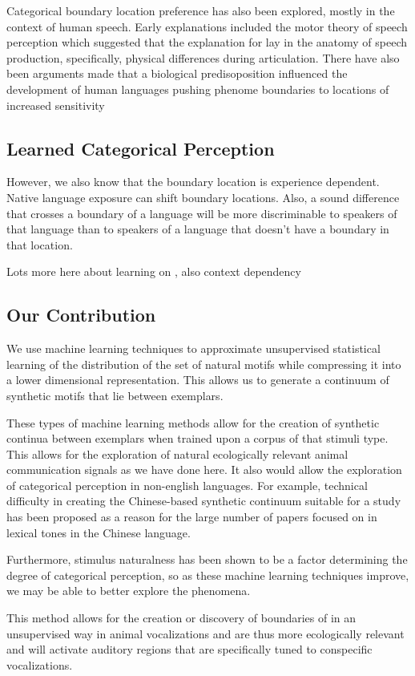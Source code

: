 Categorical boundary location preference has also been explored, mostly in the context of human speech. Early explanations included the motor theory of speech perception which suggested that the explanation for \CP lay in the anatomy of speech production, specifically, physical differences during articulation\cite{liberman1967perception}. There have also been arguments made that a biological predisoposition influenced the development of human languages pushing phenome boundaries to locations of increased sensitivity\cite{stevens1981constraints, goldstone2010categorical, halle1979some}

\subsection{Learned Categorical Perception}

However, we also know that the boundary location is experience dependent. Native language exposure can shift boundary locations. Also, a sound difference that crosses a boundary of a language will be more discriminable to speakers of that language than to speakers of a language that doesn’t have a boundary in that location.

Lots more here about learning on \CP, also context dependency

\subsection{Our Contribution}
We use machine learning techniques to approximate unsupervised statistical learning of the distribution of the set of natural motifs while compressing it into a lower dimensional representation. This allows us to generate a continuum of synthetic motifs that lie between exemplars.

These types of machine learning methods allow for the creation of synthetic continua between exemplars when trained upon a corpus of that stimuli type. This allows for the exploration of natural ecologically relevant animal communication signals as we have done here. It also would allow the exploration of categorical perception in non-english languages. For example, technical difficulty in creating the Chinese-based synthetic continuum suitable for a \CP study has been proposed as a reason for the large number of papers focused on \CP in lexical tones in the Chinese language\cite{zhang2013categorical}.

Furthermore, stimulus naturalness has been shown to be a factor determining the degree of categorical perception, so as these machine learning techniques improve, we may be able to better explore the \CP phenomena.

This method allows for the creation or discovery of boundaries of \CP in an unsupervised way in animal vocalizations and are thus more ecologically relevant and will activate auditory regions that are specifically tuned to conspecific vocalizations.
